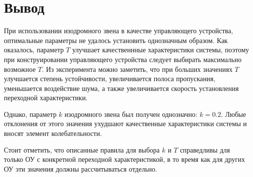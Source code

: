 \documentclass[14pt,a4paper,report]{report}
\begin{document}
	
	\section{Вывод}
	
	При использовании изодромного звена в качестве управляющего устройства, оптимальные параметры не удалось установить однозначным образом. Как оказалось, параметр $T$ улучшает качественнные характеристики системы, поэтому при конструировании управляющего устройства следует выбирать максимально возможное $T$. Из эксперимента можно заметить, что при больших значениях $T$ улучшается степень устойчивости, увеличивается полоса пропускания, уменьшается воздействие шума, а также увеличивается скорость установления переходной характеристики.
	
	Однако, параметр $k$ изодромного звена был получен однозначно: $k=0.2$. Любые отклонения от этого значения ухудшают качественные характеристики системы и вносят элемент колебательности.
	
	Стоит отметить, что описанные правила для выбора $k$ и $T$ справедливы для только ОУ с конкретной переходной характеристикой, в то время как для других ОУ эти значения должны рассчитываться отдельно.
	
	
	
	
\end{document}

